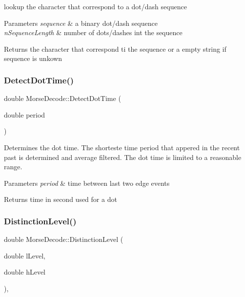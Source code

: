 lookup the character that correspond to a dot/dash sequence 


\begin{DoxyParams}{Parameters}
{\em sequence} & a binary dot/dash sequence \\
\hline
{\em n\+Sequence\+Length} & number of dots/dashes int the sequence \\
\hline
\end{DoxyParams}
\begin{DoxyReturn}{Returns}
the character that correspond ti the sequence or a empty string if sequence is unkown 
\end{DoxyReturn}
\mbox{\label{classMorseDecode_ae7a9b7844ed145918d91b6ec7337d7c2}} 
\subsubsection{\texorpdfstring{Detect\+Dot\+Time()}{DetectDotTime()}}
{\footnotesize\ttfamily double Morse\+Decode\+::\+Detect\+Dot\+Time (\begin{DoxyParamCaption}\item[{double}]{period }\end{DoxyParamCaption})\hspace{0.3cm}{\ttfamily [private]}}



Determines the dot time. The shorteste time period that appered in the recent past is determined and average filtered. The dot time is limited to a reasonable range. 


\begin{DoxyParams}{Parameters}
{\em period} & time between last two edge events \\
\hline
\end{DoxyParams}
\begin{DoxyReturn}{Returns}
time in second used for a dot 
\end{DoxyReturn}
\mbox{\label{classMorseDecode_a5a23bce21e6da60ae14a657096cd1e00}} 
\subsubsection{\texorpdfstring{Distinction\+Level()}{DistinctionLevel()}}
{\footnotesize\ttfamily double Morse\+Decode\+::\+Distinction\+Level (\begin{DoxyParamCaption}\item[{double}]{l\+Level,  }\item[{double}]{h\+Level }\end{DoxyParamCaption})\hspace{0.3cm}{\ttfamily [inline]}, {\ttfamily [private]}}



